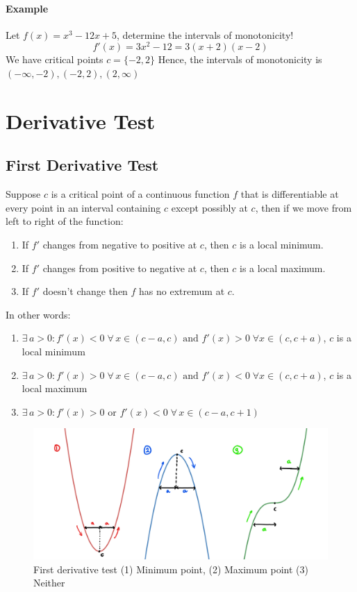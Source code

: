 \documentclass[12pt]{article}
\begin{document}
\paragraph{Example} Let $f(x) = x^3 - 12x + 5$, determine the intervals of monotonicity!
\[
    f'(x) = 3x^2 - 12 = 3(x + 2)(x - 2)
\]
We have critical points $c = \{-2, 2\}$
Hence, the intervals of monotonicity is $(-\infty, -2), (-2, 2), (2, \infty)$ 
\section{Derivative Test}
\subsection{First Derivative Test}
Suppose $c$ is a critical point of a continuous function $f$ that is differentiable at 
every point in an interval containing $c$ except possibly at $c$, then if we move from left to right 
of the function:
\begin{enumerate} 
     \item If $f'$ changes from negative to positive at $c$, then $c$ is a local minimum.
     \item If $f'$ changes from positive to negative at $c$, then $c$ is a local maximum.
     \item If $f'$ doesn't change then $f$ has no extremum at $c$.
\end{enumerate}
In other words:
\begin{enumerate} 
    \item $\exists \, a > 0 : f'(x) < 0 \; \forall \, x \in (c - a, c) \textrm{ and }  f'(x) > 0 \; \forall x \in (c, c + a)$, $c$ is a local minimum
    \item $\exists \, a > 0 : f'(x) > 0 \; \forall \, x \in (c - a, c) \textrm{ and }  f'(x) < 0 \; \forall x \in (c, c + a)$, $c$ is a local maximum
    \item $\exists \, a > 0 : f'(x) > 0 \textrm{ or } f'(x) < 0 \; \forall \, x \in (c - a, c + 1)$
\end{enumerate}

\begin{figure}[h!]
    \centering
    \includegraphics[width = 0.6\linewidth]{Images/first derivative test.png}
    \caption{First derivative test (1) Minimum point, (2) Maximum point (3) Neither}
\end{figure}
\end{document}
